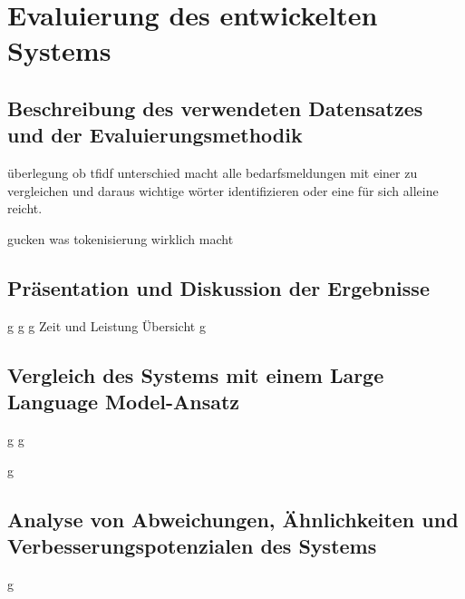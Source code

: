 \chapter{Evaluierung des entwickelten Systems}
\label{chap:evaluierung}

\section{Beschreibung des verwendeten Datensatzes und der Evaluierungsmethodik}
\newpage

überlegung ob tfidf unterschied macht alle bedarfsmeldungen mit einer zu vergleichen und daraus wichtige wörter identifizieren oder eine für sich alleine reicht.

gucken was tokenisierung wirklich macht
\section{Präsentation und Diskussion der Ergebnisse}
\newpage
g
\newpage
g
\newpage
g
\newpage
Zeit und Leistung Übersicht
\newpage
g
\newpage

\section{Vergleich des Systems mit einem Large Language Model-Ansatz}
\newpage
g
\newpage
g
\newpage

g
\newpage

\section{Analyse von Abweichungen, Ähnlichkeiten und Verbesserungspotenzialen des Systems}
\newpage
g
\newpage